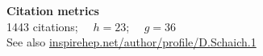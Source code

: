 \renewenvironment{spacelistout} {
  \begin{list} {} {
    \setlength{\topsep}{-8 pt}
    \setlength{\itemsep}{5 pt}
    \setlength{\leftmargin}{-1.15 in}
  }
}{
  \end{list}
}

\raggedright

\begin{spacelistout}
  \item {\large \bfseries Citation metrics} \\[6 pt]
  1443 citations; \ \ \href{https://en.wikipedia.org/wiki/H-index}{$h = 23$}; \ \ \href{https://en.wikipedia.org/wiki/G-index}{$g = 36$} \\[2 pt]
  See also \href{http://inspirehep.net/author/profile/D.Schaich.1}{inspirehep.net/author/profile/D.Schaich.1} \\[15 pt]


\end{spacelistout}
